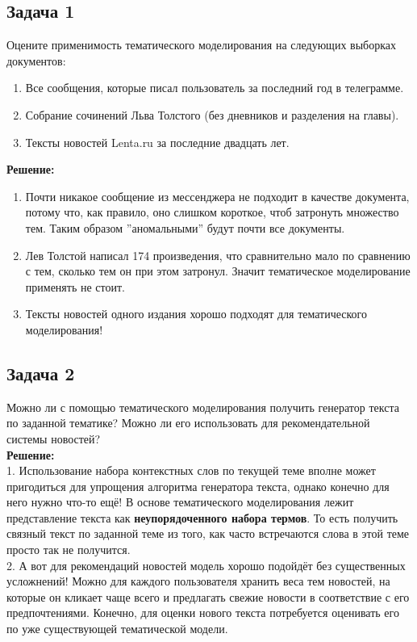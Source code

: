 \subsection*{Задача 1}
Оцените применимость тематического моделирования на следующих выборках документов:
\begin{enumerate}
    \item Все сообщения, которые писал пользователь за последний год в телеграмме.
    \item Собрание сочинений Льва Толстого (без дневников и разделения на главы). 
    \item Тексты новостей Lenta.ru за последние двадцать лет.
\end{enumerate}
\textbf{Решение:}
\begin{enumerate}
    \item Почти никакое сообщение из мессенджера не подходит в качестве документа, потому что, как правило, оно слишком короткое, чтоб затронуть множество тем. Таким образом ''аномальными'' будут почти все документы. 
    \item Лев Толстой написал 174 произведения, что сравнительно мало по сравнению с тем, сколько тем он при этом затронул. Значит тематическое моделирование применять не стоит.
    \item Тексты новостей одного издания хорошо подходят для тематического моделирования!
\end{enumerate}


\subsection*{Задача 2}
Можно ли с помощью тематического моделирования получить генератор текста по заданной тематике? Можно ли его использовать для рекомендательной системы новостей?\\
\textbf{Решение:}\\
1. Использование набора контекстных слов по текущей теме вполне может пригодиться для упрощения алгоритма генератора текста, однако конечно для него нужно что-то ещё! В основе тематического моделирования лежит представление текста как \textbf{неупорядоченного набора термов}. То есть получить связный текст по заданной теме из того, как часто встречаются слова в этой теме просто так не получится. \\
2. А вот для рекомендаций новостей модель хорошо подойдёт без существенных усложнений! Можно для каждого пользователя хранить веса тем новостей, на которые он кликает чаще всего и предлагать свежие новости в соответствие с его предпочтениями. Конечно, для оценки нового текста потребуется оценивать его по уже существующей тематической модели.

